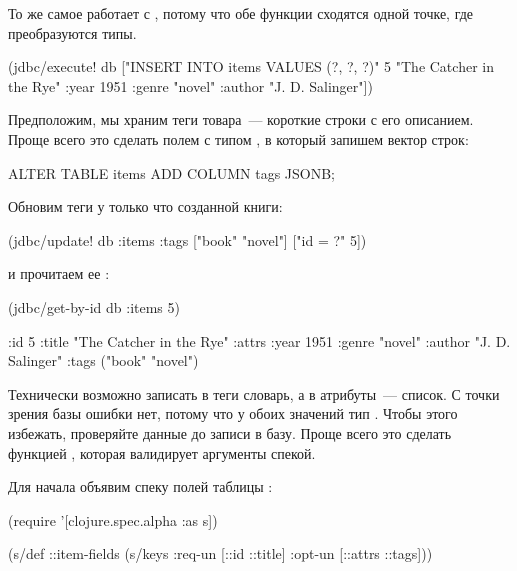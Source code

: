 То же самое работает с , потому что обе функции сходятся одной точке, где преобразуются типы.

\begin{english}
  \begin{clojure}
(jdbc/execute!
  db
  ["INSERT INTO items VALUES (?, ?, ?)"
  5
  "The Catcher in the Rye"
  {:year 1951 :genre "novel"
   :author "J. D. Salinger"}])
  \end{clojure}
\end{english}

Предположим, мы храним теги товара~--- короткие строки с его описанием. Проще всего это сделать полем  с типом , в который запишем вектор строк:

\begin{english}
  \begin{sql}
ALTER TABLE items ADD COLUMN tags JSONB;
  \end{sql}
\end{english}

Обновим теги у только что созданной книги:

\begin{english}
  \begin{clojure}
(jdbc/update! db :items
              {:tags ["book" "novel"]}
              ["id = ?" 5])
  \end{clojure}
\end{english}


\noindent
и прочитаем ее :

\begin{english}
  \begin{clojure/lines}
(jdbc/get-by-id db :items 5)

{:id 5
 :title "The Catcher in the Rye"
 :attrs {:year 1951 :genre "novel"
         :author "J. D. Salinger"}
 :tags ("book" "novel")}
  \end{clojure/lines}
\end{english}

Технически возможно записать в теги словарь, а в атрибуты~--- список. С точки зрения базы ошибки нет, потому что у обоих значений тип . Чтобы этого избежать, проверяйте данные до записи в базу. Проще всего это сделать функцией , которая валидирует аргументы спекой.

Для начала объявим спеку полей таблицы :

\begin{english}
  \begin{clojure}
(require '[clojure.spec.alpha :as s])

(s/def ::item-fields
  (s/keys :req-un [::id ::title]
          :opt-un [::attrs ::tags]))
  \end{clojure}
\end{english}

